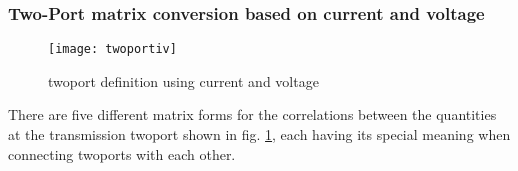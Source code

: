\subsubsection{Two-Port matrix conversion based on current and voltage}

\begin{figure}[ht]
\begin{center}
\texttt{[image: twoportiv]}
\end{center}
\caption{twoport definition using current and voltage}
\label{fig:twoportiv}
\end{figure}
\FloatBarrier

There are five different matrix forms for the correlations between the
quantities at the transmission twoport shown in
fig. \ref{fig:twoportiv}, each having its special meaning when
connecting twoports with each other.

